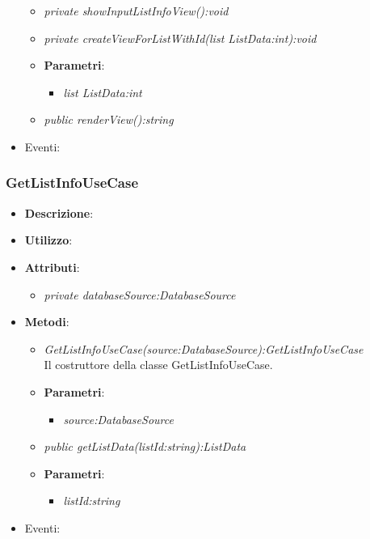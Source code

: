 \begin{itemize}
\begin{itemize}
{\begin{itemize}
			\end{itemize}}
	\item \textit{private showInputListInfoView():void}\\

	\item \textit{private createViewForListWithId(list ListData:int):void}\\

			\item{\textbf{Parametri}: \begin{itemize}
			\item \textit{list ListData:int}\\

			\end{itemize}}
	\item \textit{public renderView():string}\\

	\end{itemize} 
\item{Eventi}:
\end{itemize}

\subsubsection{GetListInfoUseCase}
\begin{itemize}
\item \textbf{Descrizione}: 
\item \textbf{Utilizzo}:
\item \textbf{Attributi}: 
	\begin{itemize}
	\item \textit{private databaseSource:DatabaseSource}\\
	
	\end{itemize}
\item \textbf{Metodi}:
	\begin{itemize}
	\item \textit{GetListInfoUseCase(source:DatabaseSource):GetListInfoUseCase}\\
	Il costruttore della classe GetListInfoUseCase.
			\item{\textbf{Parametri}: \begin{itemize}
			\item \textit{source:DatabaseSource}\\

			\end{itemize}}
	\item \textit{public getListData(listId:string):ListData}\\
	
				\item{\textbf{Parametri}: \begin{itemize}
				\item \textit{listId:string}\\
				
				\end{itemize}}
	\end{itemize}
\item{Eventi}:
\end{itemize}

